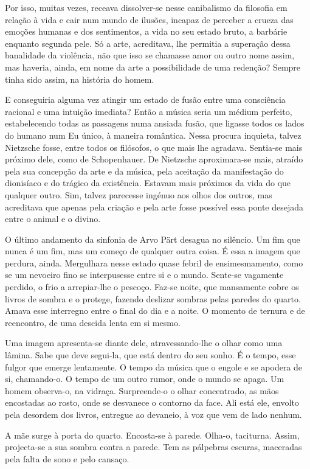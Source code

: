 Por isso, muitas vezes, receava dissolver-se nesse canibalismo da
filosofia em relação à vida e cair num mundo de ilusões, incapaz de
perceber a crueza das emoções humanas e dos sentimentos, a vida no seu
estado bruto, a barbárie enquanto segunda pele. Só a arte, acreditava,
lhe permitia a superação dessa banalidade da violência, não que isso se
chamasse amor ou outro nome assim, mas haveria, ainda, em nome da arte a
possibilidade de uma redenção? Sempre tinha sido assim, na história do
homem.

E conseguiria alguma vez atingir um estado de fusão entre uma
consciência racional e uma intuição imediata? Então a música seria um
médium perfeito, estabelecendo todas as passagens numa ansiada fusão,
que ligasse todos os lados do humano num Eu único, à maneira romântica.
Nessa procura inquieta, talvez Nietzsche fosse, entre todos os
filósofos, o que mais lhe agradava. Sentia-se mais próximo dele, como de
Schopenhauer. De Nietzsche aproximara-se mais, atraído pela sua
concepção da arte e da música, pela aceitação da manifestação do
dionisíaco e do trágico da existência. Estavam mais próximos da vida do
que qualquer outro. Sim, talvez parecesse ingénuo aos olhos dos outros,
mas acreditava que apenas pela criação e pela arte fosse possível essa
ponte desejada entre o animal e o divino.

O último andamento da sinfonia de Arvo Pärt desagua no silêncio. Um fim
que nunca é um fim, mas um começo de qualquer outra coisa. É essa a
imagem que perdura, ainda. Mergulhara nesse estado quase febril de
ensimesmamento, como se um nevoeiro fino se interpusesse entre si e o
mundo. Sente-se vagamente perdido, o frio a arrepiar-lhe o pescoço.
Faz-se noite, que mansamente cobre os livros de sombra e o protege,
fazendo deslizar sombras pelas paredes do quarto. Amava esse interregno
entre o final do dia e a noite. O momento de ternura e de reencontro, de
uma descida lenta em si mesmo.

Uma imagem apresenta-se diante dele, atravessando-lhe o olhar como uma
lâmina. Sabe que deve segui-la, que está dentro do seu sonho. É o tempo,
esse fulgor que emerge lentamente. O tempo da música que o engole e se
apodera de si, chamando-o. O tempo de um outro rumor, onde o mundo se
apaga. Um homem observa-o, na vidraça. Surpreende-o o olhar concentrado,
as mãos encostadas ao rosto, onde se desvanece o contorno da face. Ali
está ele, envolto pela desordem dos livros, entregue ao devaneio, à voz
que vem de lado nenhum.

A mãe surge à porta do quarto. Encosta-se à parede. Olha-o, taciturna.
Assim, projecta-se a sua sombra contra a parede. Tem as pálpebras
escuras, maceradas pela falta de sono e pelo cansaço.

